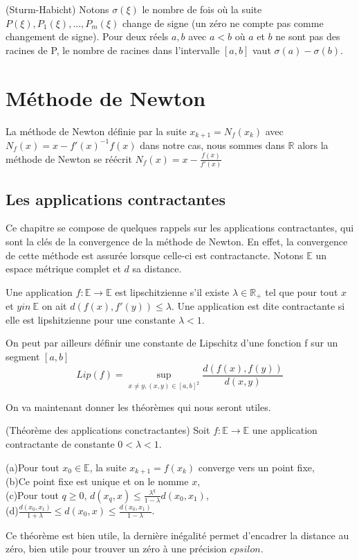 \documentclass[a4paper,10.5pt]{article}
\begin{document}
	\begin{theorem}(Sturm-Habicht)
		Notons $\sigma(\xi)$ le nombre de fois où la suite $P(\xi),P_{1}(\xi),...,P_{m}(\xi)$ change de signe (un zéro ne compte pas comme changement de signe).
		Pour deux réels $a,b$ avec $a<b$ où $a$ et $b$ ne sont pas des racines de P, le nombre de racines dans l'intervalle $[a,b]$ vaut
		$\sigma(a)-\sigma(b)$.
	\end{theorem}
	
	\section{Méthode de Newton}
	
	La méthode de Newton définie par la suite $x_{k+1}=N_{f}(x_{k})$ avec $N_{f}(x)=x-f'(x)^{-1}f(x)$ dans notre cas, nous sommes dans $\mathbb{R}$ alors la méthode de Newton se réécrit $N_{f}(x)=x-\frac{f(x)}{f'(x)}$ 
	
	\subsection{Les applications contractantes}
	
	Ce chapitre se compose de quelques rappels sur les applications contractantes, qui sont la clés de la convergence de la méthode de Newton. En effet, la convergence de cette méthode est assurée lorsque celle-ci est contractancte. 
	Notons $\mathbb{E}$ un espace métrique complet et $d$ sa distance.
	
	
	\begin{definition} Une application $f: \mathbb{E} \rightarrow \mathbb{E}$ est lipschitzienne s'il existe $\lambda \in \mathbb{R}_{+}$ tel que pour tout $x$ et $y in\ \mathbb{E}$ on ait $d(f(x),f'(y)) \leq \lambda$. Une application est dite contractante si elle est lipshitzienne pour une constante $\lambda <1$. 
	\end{definition}
	On peut par ailleurs définir une constante de Lipschitz d'une fonction f sur un segment $[a,b]$
	\[Lip(f)=\sup_{x \neq y,(x,y)\in [a,b]^2} \frac{d(f(x),f(y))}{d(x,y)}\]
	
	On va maintenant donner les théorèmes qui nous seront utiles.
	\begin{theorem}(Théorème des applications conctractantes) Soit $f:\mathbb{E} \rightarrow \mathbb{E}$ une application contractante de constante $0<\lambda<1$.
		
		(a)Pour tout $x_0 \in \mathbb{E}$, la suite $x_{k+1}=f(x_k)$ converge vers un point fixe,\\
		
		(b)Ce point fixe est unique et on le nomme $x$,\\
		
		(c)Pour tout $q \geq 0$, $d(x_q,x) \leq \frac{\lambda^q}{1-\lambda} d(x_0,x_1)$,\\
		
		(d)$\frac{d(x_0,x_1)}{1+\lambda} \leq d(x_0,x) \leq \frac{d(x_0,x_1)}{1-\lambda}$.
	\end{theorem}
	Ce théorème est bien utile, la dernière inégalité permet d'encadrer la distance au zéro, bien utile pour trouver un zéro à une précision $epsilon$. 
	
\end{document}

